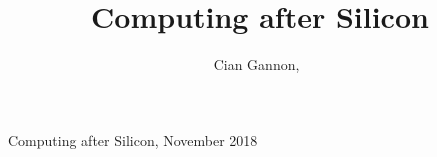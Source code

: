 \documentclass[journal]{IEEEtran}
\begin{document}
%
{Computing after Silicon, November 2018}

\title{Computing after Silicon}
\author{Cian Gannon,~}

\maketitle

\cite{8931725820180101}

\printbibliography
\end{document}
